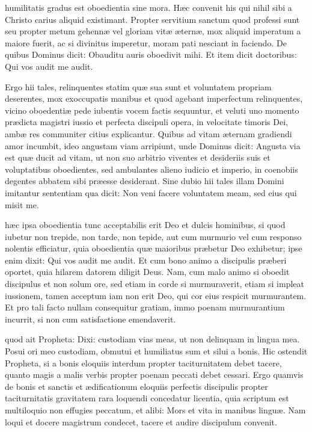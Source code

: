 \documentclass[fontsize=9pt,paper=A6,twoside,BCOR=1mm,DIV=22,headinclude]{scrarticle}
\begin{document}
\begin{multicols}{2}
 humilitatis gradus est oboedientia sine mora. Hæc convenit his qui nihil sibi a Christo carius aliquid existimant. Propter servitium sanctum quod professi sunt seu propter metum gehennæ vel gloriam vitæ æternæ, mox aliquid imperatum a maiore fuerit, ac si divinitus imperetur, moram pati nesciant in faciendo. De quibus Dominus dicit: Obauditu auris oboedivit mihi. Et item dicit doctoribus: Qui vos audit me audit.

Ergo hii tales, relinquentes statim quæ sua sunt et voluntatem propriam deserentes, mox exoccupatis manibus et quod agebant imperfectum relinquentes, vicino oboedentiæ pede iubentis vocem factis sequuntur, et veluti uno momento prædicta magistri iussio et perfecta discipuli opera, in velocitate timoris Dei, ambæ res communiter citius explicantur. Quibus ad vitam æternam gradiendi amor incumbit, ideo angustam viam arripiunt, unde Dominus dicit: Angusta via est quæ ducit ad vitam, ut non suo arbitrio viventes et desideriis suis et voluptatibus oboedientes, sed ambulantes alieno iudicio et imperio, in coenobiis degentes abbatem sibi præesse desiderant. Sine dubio hii tales illam Domini imitantur sententiam qua dicit: Non veni facere voluntatem meam, sed eius qui misit me.

 hæc ipsa oboedientia tunc acceptabilis erit Deo et dulcis hominibus, si quod iubetur non trepide, non tarde, non tepide, aut cum murmurio vel cum responso nolentis efficiatur, quia oboedientia quæ maioribus præbetur Deo exhibetur; ipse enim dixit: Qui vos audit me audit. Et cum bono animo a discipulis præberi oportet, quia hilarem datorem diligit Deus. Nam, cum malo animo si oboedit discipulus et non solum ore, sed etiam in corde si murmuraverit, etiam si impleat iussionem, tamen acceptum iam non erit Deo, qui cor eius respicit murmurantem. Et pro tali facto nullam consequitur gratiam, immo poenam murmurantium incurrit, si non cum satisfactione emendaverit. 

 quod ait Propheta: Dixi: custodiam vias meas, ut non delinquam in lingua mea. Posui ori meo custodiam, obmutui et humiliatus sum et silui a bonis. Hic ostendit Propheta, si a bonis eloquiis interdum propter taciturnitatem debet tacere, quanto magis a malis verbis propter poenam peccati debet cessari. Ergo quamvis de bonis et sanctis et ædificationum eloquiis perfectis discipulis propter taciturnitatis gravitatem rara loquendi concedatur licentia, quia scriptum est multiloquio non effugies peccatum, et alibi: Mors et vita in manibus linguæ. Nam loqui et docere magistrum condecet, tacere et audire discipulum convenit.


\end{multicols}
\end{document}
